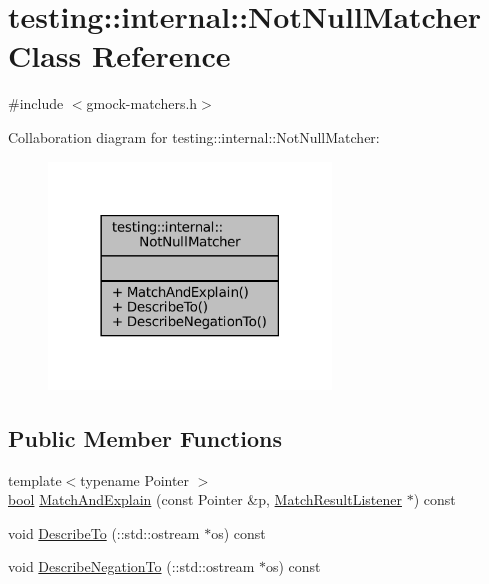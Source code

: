 \hypertarget{classtesting_1_1internal_1_1NotNullMatcher}{}\section{testing\+:\+:internal\+:\+:Not\+Null\+Matcher Class Reference}
\label{classtesting_1_1internal_1_1NotNullMatcher}


{\ttfamily \#include $<$gmock-\/matchers.\+h$>$}



Collaboration diagram for testing\+:\+:internal\+:\+:Not\+Null\+Matcher\+:
\nopagebreak
\begin{figure}[H]
\begin{center}
\leavevmode
\includegraphics[width=213pt]{classtesting_1_1internal_1_1NotNullMatcher__coll__graph}
\end{center}
\end{figure}
\subsection*{Public Member Functions}
\begin{DoxyCompactItemize}
\item 
{\footnotesize template$<$typename Pointer $>$ }\\\hyperlink{classbool}{bool} \hyperlink{classtesting_1_1internal_1_1NotNullMatcher_a8c4b04f9a91550176a6e23652f592b8e}{Match\+And\+Explain} (const Pointer \&p, \hyperlink{classtesting_1_1MatchResultListener}{Match\+Result\+Listener} $\ast$) const
\item 
void \hyperlink{classtesting_1_1internal_1_1NotNullMatcher_ac2ef2de5833c135e74e47e40484442d1}{Describe\+To} (\+::std\+::ostream $\ast$os) const
\item 
void \hyperlink{classtesting_1_1internal_1_1NotNullMatcher_a5b9c4335e8e4465e48fc73d185402ebd}{Describe\+Negation\+To} (\+::std\+::ostream $\ast$os) const
\end{DoxyCompactItemize}


